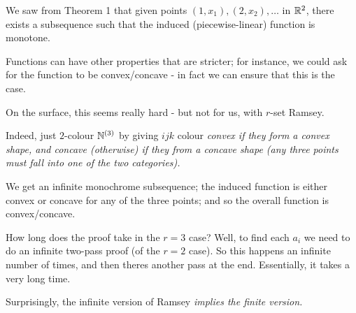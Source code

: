 \documentclass[10pt]{article}
\begin{document}
\begin{remark*}[Example]
    We saw from Theorem 1 that given points $(1,x_1),(2,x_2),\dots$ in $\mathbb{R}^2$, there exists a subsequence such that the induced (piecewise-linear) function is monotone.

    Functions can have other properties that are stricter; for instance, we could ask for the function to be convex/concave - in fact we can ensure that this is the case.

    On the surface, this seems really hard - but not for us, with $r$-set Ramsey.

    Indeed, just $2$-colour $\mathbb{N}^{(3)}$ by giving $ijk$ colour \it{convex} if they form a convex shape, and \it{concave} (otherwise) if they from a concave shape (any three points must fall into one of the two categories).
    
    We get an infinite monochrome subsequence; the induced function is either convex or concave for any of the three points; and so the overall function is convex/concave.
\end{remark*}

How long does the proof take in the $r = 3$ case? Well, to find each $a_i$ we need to do an infinite two-pass proof (of the $r = 2$ case). So this happens an infinite number of times, and then theres another pass at the end. Essentially, it takes a very long time.

Surprisingly, the infinite version of Ramsey \it{implies} the finite version.
\end{document}

